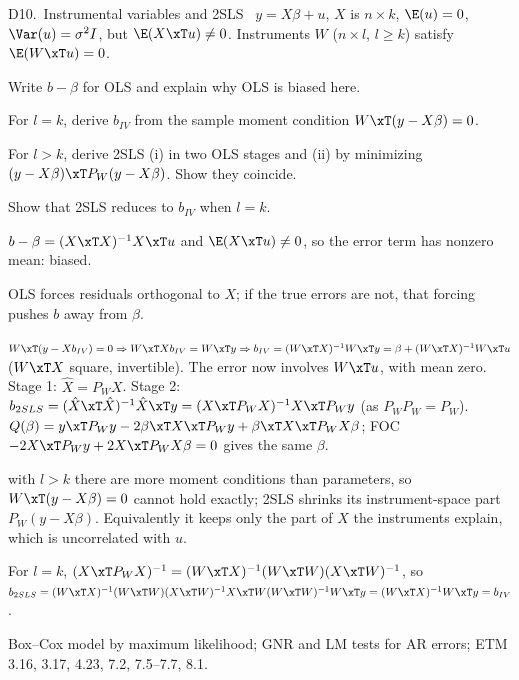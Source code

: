 \begin{qbox}{D10.\ Instrumental variables and 2SLS}{\likely\ \newtag}
$y=X\beta+u$, $X$ is $n\times k$, $\E(u)=0$, $\Var(u)=\sigma^{2}I$, but $\E(X\xT u)\ne0$. Instruments $W$ ($n\times l$, $l\ge k$) satisfy $\E(W\xT u)=0$.
\begin{flatlist}
  \item[(a)] Write $b-\beta$ for OLS and explain why OLS is biased here.
  \item[(b)] For $l=k$, derive $b_{IV}$ from the sample moment condition $W\xT(y-X\beta)=0$.
  \item[(c)] For $l>k$, derive 2SLS (i) in two OLS stages and (ii) by minimizing $(y-X\beta)\xT P_{W}(y-X\beta)$. Show they coincide.
  \item[(d)] Show that 2SLS reduces to $b_{IV}$ when $l=k$.
\end{flatlist}
\end{qbox}
\begin{solbox}
 $b-\beta=(X\xT X)^{-1}X\xT u$ and $\E(X\xT u)\ne0$, so the error term has nonzero mean: biased.
\begin{why}\Why OLS forces residuals orthogonal to $X$; if the true errors are not, that forcing pushes $b$ away from $\beta$.\end{why}
 $W\xT(y-Xb_{IV})=0\Rightarrow W\xT Xb_{IV}=W\xT y\Rightarrow b_{IV}=(W\xT X)^{-1}W\xT y=\beta+(W\xT X)^{-1}W\xT u$ ($W\xT X$ square, invertible). The error now involves $W\xT u$, with mean zero.
 Stage 1: $\hat X=P_{W}X$. Stage 2: $b_{2SLS}=(\hat X\xT\hat X)^{-1}\hat X\xT y=(X\xT P_{W}X)^{-1}X\xT P_{W}y$ (as $P_{W}P_{W}=P_{W}$).
 $Q(\beta)=y\xT P_{W}y-2\beta\xT X\xT P_{W}y+\beta\xT X\xT P_{W}X\beta$; FOC $-2X\xT P_{W}y+2X\xT P_{W}X\beta=0$ gives the same $\beta$.
\begin{why}\Why with $l>k$ there are more moment conditions than parameters, so $W\xT(y-X\beta)=0$ cannot hold exactly; 2SLS shrinks its instrument-space part $P_{W}(y-X\beta)$.
Equivalently it keeps only the part of $X$ the instruments explain, which is uncorrelated with $u$.\end{why}
 For $l=k$, $(X\xT P_{W}X)^{-1}=(W\xT X)^{-1}(W\xT W)(X\xT W)^{-1}$, so
$b_{2SLS}=(W\xT X)^{-1}(W\xT W)(X\xT W)^{-1}X\xT W(W\xT W)^{-1}W\xT y=(W\xT X)^{-1}W\xT y=b_{IV}$.
\end{solbox}

{\small Box--Cox model by maximum likelihood; GNR and LM tests for AR errors; ETM 3.16, 3.17, 4.23, 7.2, 7.5--7.7, 8.1.}

